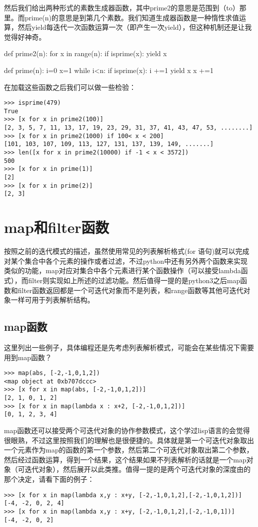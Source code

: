 \documentclass[12pt,oneside]{book}
\begin{document}
\begin{common-format}
然后我们给出两种形式的素数生成器函数，其中prime2的意思是范围到（to）那里。而prime(n)的意思是到第几个素数。我们知道生成器函数是一种惰性求值运算，然后yield每迭代一次函数运算一次（即产生一次yield），但这种机制还是让我觉得好神奇。

\begin{tcbpython}
def prime2(n):
    for x in range(n):
        if isprime(x):
            yield x

def prime(n):
    i=0
    x=1
    while i<n:
        if isprime(x):
            i +=1
            yield x
        x +=1
\end{tcbpython}

在加载这些函数之后我们可以做一些检验：
\begin{Verbatim}
>>> isprime(479)
True
>>> [x for x in prime2(100)]
[2, 3, 5, 7, 11, 13, 17, 19, 23, 29, 31, 37, 41, 43, 47, 53, ........]
>>> [x for x in prime2(1000) if 100< x < 200]
[101, 103, 107, 109, 113, 127, 131, 137, 139, 149, .......]
>>> len([x for x in prime2(10000) if -1 < x < 3572])
500
>>> [x for x in prime(1)]
[2]
>>> [x for x in prime(2)]
[2, 3]
\end{Verbatim}



\section{map和filter函数}
按照之前的迭代模式的描述，虽然使用常见的列表解析格式(for 语句)就可以完成对某个集合中各个元素的操作或者过滤，不过python中还有另外两个函数来实现类似的功能，map对应对集合中各个元素进行某个函数操作（可以接受lambda函式），而filter则实现如上所述的过滤功能。然后值得一提的是python3之后map函数和filter函数返回都是一个可迭代对象而不是列表，和range函数等其他可迭代对象一样可用于列表解析结构。

\subsection{map函数}
这里列出一些例子，具体编程还是先考虑列表解析模式，可能会在某些情况下需要用到map函数？

\begin{Verbatim}
>>> map(abs, [-2,-1,0,1,2])
<map object at 0xb707dccc>
>>> [x for x in map(abs, [-2,-1,0,1,2])]
[2, 1, 0, 1, 2]
>>> [x for x in map(lambda x : x+2, [-2,-1,0,1,2])]
[0, 1, 2, 3, 4]
\end{Verbatim}


map函数还可以接受两个可迭代对象的协作参数模式，这个学过lisp语言的会觉得很眼熟，不过这里按照我们的理解也是很便捷的。具体就是第一个可迭代对象取出一个元素作为map的函数的第一个参数，然后第二个可迭代对象取出第二个参数，然后经过函数运算，得到一个结果，这个结果如果不列表解析的话就是一个map对象（可迭代对象），然后展开以此类推。值得一提的是两个可迭代对象的深度由的那个决定，请看下面的例子：
\begin{Verbatim}
>>> [x for x in map(lambda x,y : x+y, [-2,-1,0,1,2],[-2,-1,0,1,2])]
[-4, -2, 0, 2, 4]
>>> [x for x in map(lambda x,y : x+y, [-2,-1,0,1,2],[-2,-1,0,1])]
[-4, -2, 0, 2]
\end{Verbatim}


\end{common-format}
\end{document}

